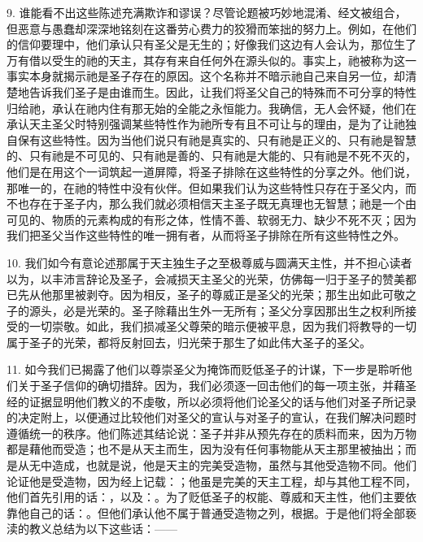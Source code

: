 9. 谁能看不出这些陈述充满欺诈和谬误？尽管论题被巧妙地混淆、经文被组合，但恶意与愚蠢却深深地铭刻在这番劳心费力的狡猾而笨拙的努力上。例如，在他们的信仰要理中，他们承认只有圣父是无生的；好像我们这边有人会认为，那位生了万有借以受生的祂的天主，其存有来自任何外在源头似的。事实上，祂被称为这一事实本身就揭示祂是圣子存在的原因。这个名称并不暗示祂自己来自另一位，却清楚地告诉我们圣子是由谁而生。因此，让我们将圣父自己的特殊而不可分享的特性归给祂，承认在祂内住有那无始的全能之永恒能力。我确信，无人会怀疑，他们在承认天主圣父时特别强调某些特性作为祂所专有且不可让与的理由，是为了让祂独自保有这些特性。因为当他们说只有祂是真实的、只有祂是正义的、只有祂是智慧的、只有祂是不可见的、只有祂是善的、只有祂是大能的、只有祂是不死不灭的，他们是在用这个一词筑起一道屏障，将圣子排除在这些特性的分享之外。他们说，那唯一的，在祂的特性中没有伙伴。但如果我们认为这些特性只存在于圣父内，而不也存在于圣子内，那么我们就必须相信天主圣子既无真理也无智慧；祂是一个由可见的、物质的元素构成的有形之体，性情不善、软弱无力、缺少不死不灭；因为我们把圣父当作这些特性的唯一拥有者，从而将圣子排除在所有这些特性之外。\par

10. 我们如今有意论述那属于天主独生子之至极尊威与圆满天主性，并不担心读者以为，以丰沛言辞论及圣子，会减损天主圣父的光荣，仿佛每一归于圣子的赞美都已先从他那里被剥夺。因为相反，圣子的尊威正是圣父的光荣；那生出如此可敬之子的源头，必是光荣的。圣子除藉出生外一无所有；圣父分享因那出生之权利所接受的一切崇敬。如此，我们损减圣父尊荣的暗示便被平息，因为我们将教导的一切属于圣子的光荣，都将反射回去，归光荣于那生了如此伟大圣子的圣父。\par

11. 如今我们已揭露了他们以尊崇圣父为掩饰而贬低圣子的计谋，下一步是聆听他们关于圣子信仰的确切措辞。因为，我们必须逐一回击他们的每一项主张，并藉圣经的证据显明他们教义的不虔敬，所以必须将他们论圣父的话与他们对圣子所记录的决定附上，以便通过比较他们对圣父的宣认与对圣子的宣认，在我们解决问题时遵循统一的秩序。他们陈述其结论说：圣子并非从预先存在的质料而来，因为万物都是藉他而受造；也不是从天主而生，因为没有任何事物能从天主那里被抽出；而是从无中造成，也就是说，他是天主的完美受造物，虽然与其他受造物不同。他们论证他是受造物，因为经上记载：；他虽是完美的天主工程，却与其他工程不同，他们首先引用的话：，以及：。为了贬低圣子的权能、尊威和天主性，他们主要依靠他自己的话：。但他们承认他不属于普通受造物之列，根据。于是他们将全部亵渎的教义总结为以下这些话：——\par

